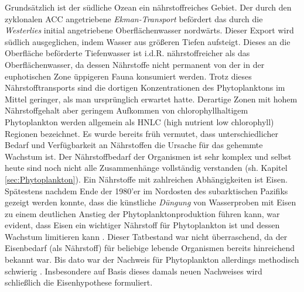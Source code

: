 \documentclass[12pt,a4paper,onecolumn,draft]{scrartcl}
\begin{document}
Grundsätzlich ist der südliche Ozean ein nährstoffreiches Gebiet. Der durch den zyklonalen ACC angetriebene \textit{Ekman-Transport} befördert das durch die \textit{Westerlies} initial angetriebene Oberflächenwasser nordwärts. Dieser Export wird südlich ausgeglichen, indem Wasser aus größeren Tiefen aufsteigt. Dieses an die Oberfläche beförderte Tiefenwasser ist i.d.R. nährstoffreicher als das Oberflächenwasser, da dessen Nährstoffe nicht permanent von der in der euphotischen Zone üppigeren Fauna konsumiert werden. Trotz dieses Nährstofftransports sind die dortigen Konzentrationen des Phytoplanktons im Mittel geringer, als man ursprünglich erwartet hatte. Derartige Zonen mit hohem Nährstoffgehalt aber geringem Aufkommen von chlorophyllhaltigem Phytoplankton werden allgemein als HNLC (high nutrient low chlorophyll) Regionen bezeichnet. Es wurde bereits früh vermutet, dass unterschiedlicher Bedarf und Verfügbarkeit an Nährstoffen die Ursache für das gehemmte Wachstum ist. Der Nährstoffbedarf der Organismen ist sehr komplex und selbst heute sind noch nicht alle Zusammenhänge vollständig verstanden (sh. Kapitel \ref{sec:Phytoplankton}). Ein Nährstoffe mit zahlreichen Abhängigkeiten ist Eisen. Spätestens nachdem Ende der 1980'er im Nordosten des subarktischen Pazifiks gezeigt werden konnte, dass die künstliche \textit{Düngung} von Wasserproben mit Eisen zu einem deutlichen Anstieg der Phytoplanktonproduktion führen kann, war evident, dass Eisen ein wichtiger Nährstoff für Phytoplankton ist und dessen Wachstum limitieren kann \citep{Martin.1988}. Dieser Tatbestand war nicht überraschend, da der Eisenbedarf (als Nährstoff) für beliebige lebende Organismen bereits hinreichend bekannt war. Bis dato war der Nachweis für Phytoplankton allerdings methodisch schwierig \citep{Martin.1988}. Insbesondere auf Basis dieses damals neuen Nachweises wird schließlich die Eisenhypothese formuliert. \\
\end{document}
